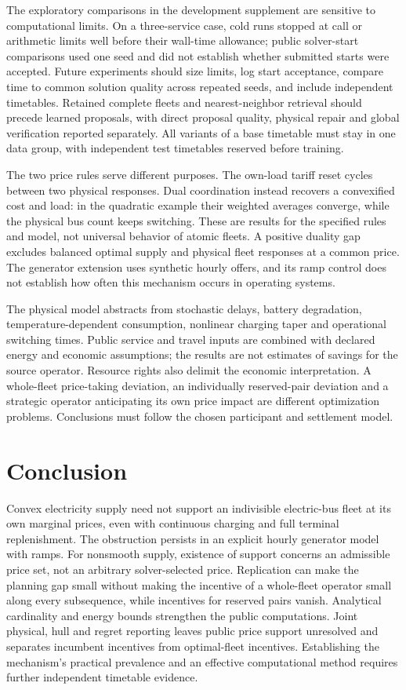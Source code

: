\documentclass[11pt]{article}
\let\originalsection\section
\renewcommand{\section}{\FloatBarrier\originalsection}
\begin{document}
The exploratory comparisons in the development supplement are sensitive to computational limits. On a three-service case, cold runs stopped at call or arithmetic limits well before their wall-time allowance; public solver-start comparisons used one seed and did not establish whether submitted starts were accepted. Future experiments should size limits, log start acceptance, compare time to common solution quality across repeated seeds, and include independent timetables. Retained complete fleets and nearest-neighbor retrieval should precede learned proposals, with direct proposal quality, physical repair and global verification reported separately. All variants of a base timetable must stay in one data group, with independent test timetables reserved before training.

The two price rules serve different purposes. The own-load tariff reset cycles between two physical responses. Dual coordination instead recovers a convexified cost and load: in the quadratic example their weighted averages converge, while the physical bus count keeps switching. These are results for the specified rules and model, not universal behavior of atomic fleets. A positive duality gap excludes balanced optimal supply and physical fleet responses at a common price. The generator extension uses synthetic hourly offers, and its ramp control does not establish how often this mechanism occurs in operating systems.

The physical model abstracts from stochastic delays, battery degradation, temperature-dependent consumption, nonlinear charging taper and operational switching times. Public service and travel inputs are combined with declared energy and economic assumptions; the results are not estimates of savings for the source operator. Resource rights also delimit the economic interpretation. A whole-fleet price-taking deviation, an individually reserved-pair deviation and a strategic operator anticipating its own price impact are different optimization problems. Conclusions must follow the chosen participant and settlement model.

\section{Conclusion}
Convex electricity supply need not support an indivisible electric-bus fleet at its own marginal prices, even with continuous charging and full terminal replenishment. The obstruction persists in an explicit hourly generator model with ramps. For nonsmooth supply, existence of support concerns an admissible price set, not an arbitrary solver-selected price. Replication can make the planning gap small without making the incentive of a whole-fleet operator small along every subsequence, while incentives for reserved pairs vanish. Analytical cardinality and energy bounds strengthen the public computations. Joint physical, hull and regret reporting leaves public price support unresolved and separates incumbent incentives from optimal-fleet incentives. Establishing the mechanism's practical prevalence and an effective computational method requires further independent timetable evidence.
\end{document}
